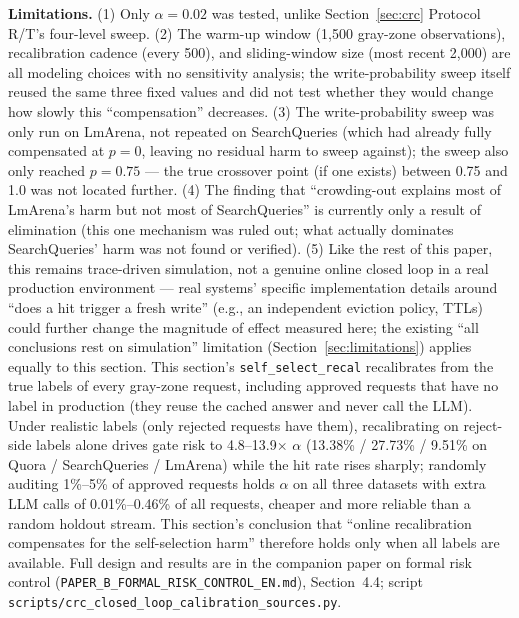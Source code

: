 \documentclass[11pt]{article}
\begin{document}
\textbf{Limitations.} (1) Only $\alpha=0.02$ was tested, unlike Section~\ref{sec:crc} Protocol R/T's four-level sweep. (2) The warm-up window (1{,}500 gray-zone observations), recalibration cadence (every 500), and sliding-window size (most recent 2{,}000) are all modeling choices with no sensitivity analysis; the write-probability sweep itself reused the same three fixed values and did not test whether they would change how slowly this ``compensation'' decreases. (3) The write-probability sweep was only run on LmArena, not repeated on SearchQueries (which had already fully compensated at $p=0$, leaving no residual harm to sweep against); the sweep also only reached $p=0.75$ --- the true crossover point (if one exists) between 0.75 and 1.0 was not located further. (4) The finding that ``crowding-out explains most of LmArena's harm but not most of SearchQueries'' is currently only a result of elimination (this one mechanism was ruled out; what actually dominates SearchQueries' harm was not found or verified). (5) Like the rest of this paper, this remains trace-driven simulation, not a genuine online closed loop in a real production environment --- real systems' specific implementation details around ``does a hit trigger a fresh write'' (e.g., an independent eviction policy, TTLs) could further change the magnitude of effect measured here; the existing ``all conclusions rest on simulation'' limitation (Section~\ref{sec:limitations}) applies equally to this section. This section's \texttt{self\_\allowbreak{}select\_\allowbreak{}recal} recalibrates from the true labels of every gray-zone request, including approved requests that have no label in production (they reuse the cached answer and never call the LLM). Under realistic labels (only rejected requests have them), recalibrating on reject-side labels alone drives gate risk to 4.8--13.9$\times$ $\alpha$ (13.38\% / 27.73\% / 9.51\% on Quora / SearchQueries / LmArena) while the hit rate rises sharply; randomly auditing 1\%--5\% of approved requests holds $\alpha$ on all three datasets with extra LLM calls of 0.01\%--0.46\% of all requests, cheaper and more reliable than a random holdout stream. This section's conclusion that ``online recalibration compensates for the self-selection harm'' therefore holds only when all labels are available. Full design and results are in the companion paper on formal risk control (\texttt{PAPER\_\allowbreak{}B\_\allowbreak{}FORMAL\_\allowbreak{}RISK\_\allowbreak{}CONTROL\_\allowbreak{}EN.\allowbreak{}md}), Section~4.4; script \texttt{scripts/\allowbreak{}crc\_\allowbreak{}closed\_\allowbreak{}loop\_\allowbreak{}calibration\_\allowbreak{}sources.\allowbreak{}py}.
\end{document}
